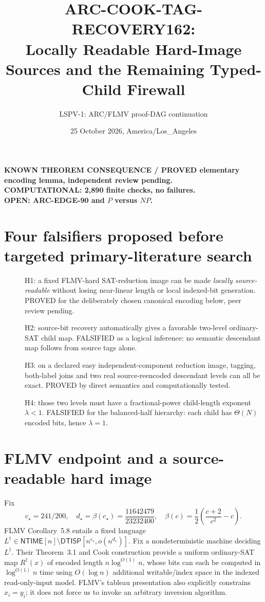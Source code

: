 \documentclass[11pt]{article}
\title{ARC-COOK-TAG-RECOVERY162:\\
\large Locally Readable Hard-Image Sources and the Remaining Typed-Child Firewall}
\author{LSPV-1: ARC/FLMV proof-DAG continuation}
\date{25 October 2026, America/Los\_Angeles}
\newcommand{\NTIME}{\mathsf{NTIME}}
\newcommand{\DTISP}{\mathsf{DTISP}}
\begin{document}
\maketitle
\begin{center}
\textbf{KNOWN THEOREM CONSEQUENCE / PROVED elementary encoding lemma, independent review pending.}\\
\textbf{COMPUTATIONAL: 2,890 finite checks, no failures.}\\
\textbf{OPEN: ARC-EDGE-90 and $P$ versus $NP$.}
\end{center}

\section{Four falsifiers proposed before targeted primary-literature search}
\begin{description}
\item[] H1: a fixed FLMV-hard SAT-reduction image can be made \emph{locally source-readable} without losing near-linear length or local indexed-bit generation. PROVED for the deliberately chosen canonical encoding below, peer review pending.
\item[] H2: source-bit recovery automatically gives a favorable two-level ordinary-SAT child map. FALSIFIED as a logical inference: no semantic descendant map follows from source tags alone.
\item[] H3: on a declared easy independent-component reduction image, tagging, both-label joins and two real source-reencoded descendant levels can all be exact. PROVED by direct semantics and computationally tested.
\item[] H4: those two levels must have a fractional-power child-length exponent $\lambda<1$. FALSIFIED for the balanced-half hierarchy: each child has $\Theta(N)$ encoded bits, hence $\lambda=1$.
\end{description}

\section{FLMV endpoint and a source-readable hard image}
Fix
\[
c_\star=241/200,\quad d_\star=\beta(c_\star)
=\frac{11642479}{23232400},\quad
\beta(c)=\frac12\left(\frac{c+2}{c^2}-c\right).
\]
FLMV Corollary~5.8 entails a fixed language
$L^\dagger\in\NTIME[n]\setminus\DTISP[n^{c_\star},o(n^{d_\star})]$.
Fix a nondeterministic machine deciding $L^\dagger$.
Their Theorem~3.1 and Cook construction provide a uniform ordinary-SAT
map $R^\dagger(x)$ of encoded length
$n\log^{O(1)}n$, whose bits can each be computed in
$\log^{O(1)}n$ time using $O(\log n)$ additional writable/index
space in the indexed read-only-input model. FLMV's tableau presentation
also explicitly constrains $x_i=y_i$; it does not force us to invoke
an arbitrary inversion algorithm.
\end{document}
